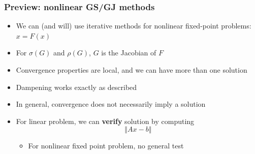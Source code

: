 \documentclass[bigger]{beamer}
\begin{document}
\begin{frame}%

\frametitle{Preview: nonlinear GS/GJ methods}

\begin{itemize}
\item We can (and will) use iterative methods \newline
for nonlinear fixed-point problems: $x=F(x)$

\item For $\sigma (G)$ and $\rho (G)$, $G$ is the Jacobian of $F$

\item Convergence properties are local, \newline
and we can have more than one solution

\item Dampening works exactly as described

\item In general, convergence does not necessarily imply a solution

\item For linear problem, we can \textbf{verify} solution by computing 
\begin{equation*}
\left\Vert Ax-b\right\Vert
\end{equation*}

\begin{itemize}
\item For nonlinear fixed point problem, no general test
\end{itemize}
\end{itemize}


\end{frame}%
\end{document}
